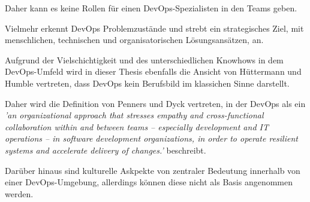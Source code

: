 Daher kann es keine Rollen für einen DevOps-Spezialisten in den Teams geben. 

Vielmehr erkennt DevOps Problemzustände und strebt ein strategisches Ziel, mit menschlichen, technischen und organisatorischen Lösungsansätzen, an. \cite{konig_devopswelcome_2019}\cite{dyck_towards_2015}

Aufgrund der Vielschichtigkeit und des unterschiedlichen Knowhows in dem DevOps-Umfeld wird in dieser Thesis ebenfalls die Ansicht von Hüttermann und Humble vertreten, dass DevOps kein Berufsbild im klassichen Sinne darstellt.

Daher wird die Definition von Penners und Dyck \cite{dyck_towards_2015} vertreten, in der DevOps als ein \textit{'an organizational approach that stresses empathy and cross-functional collaboration within and between teams – especially development and IT operations – in software development organizations, in order to operate resilient systems and accelerate delivery of changes.'} beschreibt. 

Darüber hinaus sind kulturelle Askpekte von zentraler Bedeutung innerhalb von einer DevOps-Umgebung, allerdings können diese nicht als Basis angenommen werden. \cite{smeds_devops_2015}



